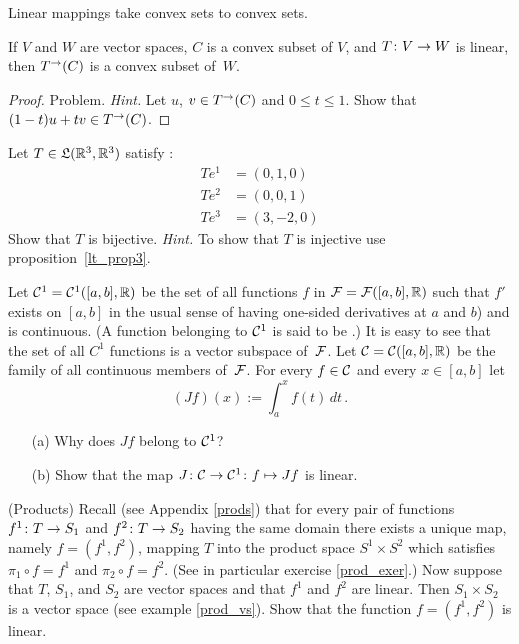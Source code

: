 Linear mappings take convex sets to convex sets.

\begin{prop}  If $V$ and $W$ are vector spaces, $C$ is a convex subset of $V$, and $T \colon
V \rightarrow W$ is linear, then $T^\rightarrow(C)$ is a convex subset of~$W$.
\end{prop}

\begin{proof}  Problem.  \emph{Hint.}  Let $u$, $v \in T^\rightarrow(C)$ and $0 \le t \le 1$.  Show
that $(1-t)u + tv \in T^\rightarrow(C)$.    \ns
\end{proof}

\begin{prob} Let $T \in \mathfrak{L}(\mathbb{R}^3,\mathbb{R}^3)$ satisfy :
 \begin{align*}
         Te^1 &= (0,1,0) \\
         Te^2 &= (0,0,1) \\
         Te^3 &= (3,-2,0)
 \end{align*}
Show that $T$ is bijective. \emph{Hint.} To show that $T$ is injective use
proposition~\ref{lt_prop3}.
\end{prob}

\begin{prob}\label{prob_intop_c1}  Let $\mathcal{C}^1 = \mathcal{C}^1([a,b],\mathbb{R})$ be the set of all functions
$f$ in $\mathcal{F} = \mathcal{F}([a,b],\mathbb{R})$ such that $f'$ exists on $[a,b]$ in the usual sense of
having one-sided derivatives at $a$ and $b$) and is continuous.  (A function belonging to
$\mathcal{C}^1$ is said to be
.)  It is easy to see that the set of all $C^1$ functions is a
vector subspace of~$\mathcal{F}$.  Let $\mathcal{C} = \mathcal{C}([a,b],\mathbb{R})$ be the family of all continuous
members of~$\mathcal{F}$.  For every $f \in \mathcal{C}$ and every $x \in [a,b]$ let
  \[ (Jf)(x) := \int_a^x f(t)\,dt\,. \]
 \begin{enumerate}
  \item[(a)]  Why does $Jf$ belong to $\mathcal{C}^1$?
  \item[(b)]  Show that the map $J \colon \mathcal{C} \rightarrow \mathcal{C}^1 \colon  f \mapsto Jf$ is linear.
 \end{enumerate}
\end{prob}

\begin{prob} (Products) Recall (see Appendix \ref{prods}) that for every pair of functions
$f^1 \colon T \rightarrow S_1$ and $f^2 \colon T \rightarrow S_2$ having the same domain there exists a
unique map, namely $f = (f^1, f^2)$, mapping $T$ into the product space $S^1 \times S^2$ which
satisfies $\pi_1 \circ f = f^1$ and $\pi_2 \circ f = f^2$.  (See in particular exercise
\ref{prod_exer}.)  Now suppose that $T$, $S_1$, and $S_2$ are vector spaces and that $f^1$ and
$f^2$ are linear. Then $S_1 \times S_2$ is a vector space (see example \ref{prod_vs}).  Show
that the function $f = (f^1,f^2)$ is linear.
\end{prob}











